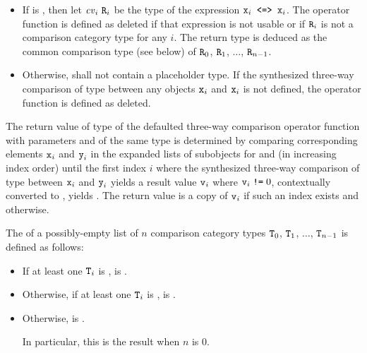 \begin{itemize}
\item
If  is , then
let $\cv{}_i~\tcode{R}_i$ be
the type of the expression $\tcode{x}_i\tcode{ <=> }\tcode{x}_i$.
The operator function is defined as deleted
if that expression is not usable or
if $\tcode{R}_i$ is not
a comparison category type for any $i$.
The return type is deduced as
the common comparison type (see below) of
$\tcode{R}_0$, $\tcode{R}_1$, $\dotsc$, $\tcode{R}_{n-1}$.
\item
Otherwise,  shall not contain a placeholder type.
If the synthesized three-way comparison of type 
between any objects $\tcode{x}_i$ and $\tcode{x}_i$
is not defined,
the operator function is defined as deleted.
\end{itemize}

\pnum
The return value of type 
of the defaulted three-way comparison operator function
with parameters  and  of the same type
is determined by comparing corresponding elements
$\tcode{x}_i$ and $\tcode{y}_i$
in the expanded lists of subobjects for  and 
(in increasing index order)
until the first index $i$ where
the synthesized three-way comparison of type 
between $\tcode{x}_i$ and $\tcode{y}_i$
yields a result value $\tcode{v}_i$ where $\tcode{v}_i \mathrel{\tcode{!=}} 0$,
contextually converted to , yields .
The return value is a copy of $\tcode{v}_i$
if such an index exists and
 otherwise.

\pnum
The  
of a possibly-empty list of $n$ comparison category types
$\tcode{T}_0$, $\tcode{T}_1$, $\dotsc$, $\tcode{T}_{n-1}$
is defined as follows:

\begin{itemize}
\item
If at least one $\tcode{T}_i$ is ,
 is .

\item
Otherwise, if at least one $\tcode{T}_i$ is ,
 is .

\item
Otherwise,  is .
\begin{note}
In particular, this is the result when $n$ is 0.
\end{note}
\end{itemize}

